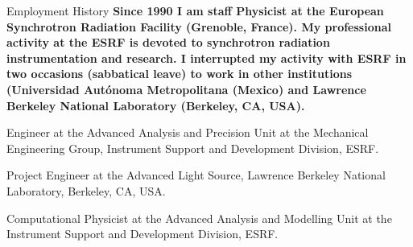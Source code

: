 \begin{rubric}{Employment History}
\entry*[]%
\textbf{Since 1990 I am staff Physicist at the European Synchrotron Radiation Facility (Grenoble, France). My professional activity at the ESRF is devoted to synchrotron radiation instrumentation and research. I interrupted my activity with ESRF in two occasions (sabbatical leave) to work in other institutions (Universidad Aut\'onoma Metropolitana (Mexico) and Lawrence Berkeley National Laboratory (Berkeley, CA, USA).}

% 
Engineer at the Advanced Analysis and Precision Unit at the Mechanical Engineering Group, Instrument Support and Development Division, ESRF.   

\entry*[2019/7/15 –- 2020/6/14]
Project Engineer at the Advanced Light Source, Lawrence Berkeley National Laboratory, Berkeley, CA, USA. 

\entry*[2009 –- 2019]  Computational Physicist at the Advanced Analysis and Modelling Unit at the Instrument Support and Development Division, ESRF. 



\end{rubric}
